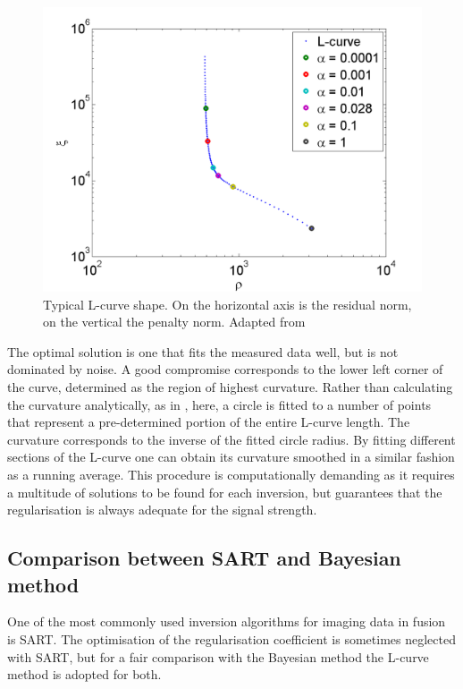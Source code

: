 \begin{figure}[!ht]
	\centering
	\includegraphics[width=0.7\linewidth]{Chapters/chapter2/figs/l-curve.png}
	\caption{Typical L-curve shape. On the horizontal axis is the residual norm, on the vertical the penalty norm. Adapted from \cite{Schou2015}}
	\label{fig:l-curve}
\end{figure}

The optimal solution is one that fits the measured data well, but is not dominated by noise. A good compromise corresponds to the lower left corner of the curve, determined as the region of highest curvature. Rather than calculating the curvature analytically, as in \cite{Schou2015}, here, a circle is fitted to a number of points that represent a pre-determined portion of the entire L-curve length. The curvature corresponds to the inverse of the fitted circle radius. By fitting different sections of the L-curve one can obtain its curvature smoothed in a similar fashion as a running average. %
This procedure is computationally demanding as it requires a multitude of solutions to be found for each inversion, but guarantees that the regularisation is always adequate for the signal strength.

\subsection{Comparison between SART and Bayesian method}
One of the most commonly used inversion algorithms for imaging data in fusion is SART. The optimisation of the regularisation coefficient is sometimes neglected with SART, but for a fair comparison with the Bayesian method the L-curve method is adopted for both.

